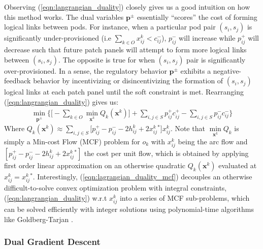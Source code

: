 \documentclass[sigconf]{acmart}
\theoremstyle{definition}
\begin{document}
Observing (\ref{eqn:langrangian_duality}) closely gives us a good intuition on how this method works. The dual variables $\mathbf{p}^\pm$ essentially ``scores'' the cost of forming logical links between pods. For instance, when a particular pod pair $(s_i, s_j)$ is significantly under-provisioned (i.e $\sum\limits_{k \in O} x_{ij}^k < c_{ij}^-$), $p_{ij}^-$ will increase while $p_{ij}^+$ will decrease such that future patch panels will attempt to form more logical links between $(s_i, s_j)$. The opposite is true for when $(s_i, s_j)$ pair is significantly over-provisioned. In a sense, the regulatory behavior $\mathbf{p}^\pm$ exhibits a negative-feedback behavior by incentivizing or disincentivizing the formation of $(s_i, s_j)$ logical links at each patch panel until the soft constraint is met. Rearranging (\ref{eqn:langrangian_duality}) gives us: 
\begin{equation}
\begin{aligned}
\min\limits_{\mathbf{p}^\pm} \Bigg\{\Big[- \sum\limits_{k \in O} \min\limits_{\mathbf{x}^k} Q_k(\mathbf{x}^k)\Big] + \sum\limits_{i, j \in S}p_{ij}^+ c_{ij}^+ - \sum\limits_{i, j \in S}p_{ij}^- c_{ij}^- \Bigg\}
\end{aligned}
\label{eqn:lagrangian_duality_mcf}
\end{equation}
Where $Q_k(\mathbf{x}^k) \approx \sum\limits_{i, j \in S}\big[p_{ij}^+ - p_{ij}^- - 2 h_{ij}^k + 2 x_{ij}^k{}^*\big]x_{ij}^k$. Note that $\min\limits_{\mathbf{x}^k}Q_k$ is simply a Min-cost Flow (MCF) problem for $o_k$ with $x_{ij}^k$ being the arc flow and $[p_{ij}^+ - p_{ij}^- - 2 h_{ij}^k + 2 x_{ij}^k{}^*]$ the cost per unit flow, which is obtained by applying first order linear approximation on an otherwise quadratic $Q_k(\mathbf{x}^k)$ evaluated at $x_{ij}^k = x_{ij}^k{}^*$. Interestingly, (\ref{eqn:lagrangian_duality_mcf}) decouples an otherwise difficult-to-solve convex optimization problem with integral constraints, (\ref{eqn:langrangian_duality}) w.r.t $x_{ij}^k$ into a series of MCF sub-problems, which can be solved efficiently with integer solutions using polynomial-time algorithms like Goldberg-Tarjan \cite{bunnagel1998efficient}.


 


\subsubsection{Dual Gradient Descent}\text{\\}
\end{document}
